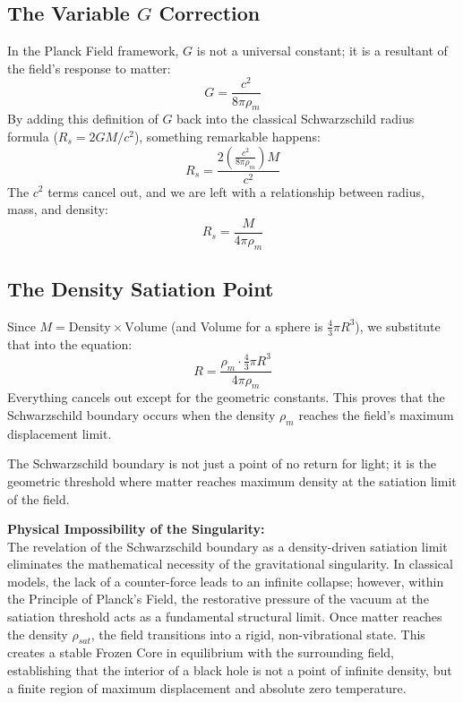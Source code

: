\documentclass[12pt,a4paper]{article}
\begin{document}
\subsection{The Variable $G$ Correction}
In the Planck Field framework, $G$ is not a universal constant; it is a resultant of the field's response to matter:
\begin{equation}
G = \frac{c^2}{8\pi\rho_m}
\end{equation}
By adding this definition of $G$ back into the classical Schwarzschild radius formula ($R_s = 2GM/c^2$), something remarkable happens:
\begin{equation}
R_s = \frac{2 \left(\frac{c^2}{8\pi\rho_m}\right) M}{c^2}
\end{equation}
The $c^2$ terms cancel out, and we are left with a relationship between radius, mass, and density:
\begin{equation}
R_s = \frac{M}{4\pi\rho_m}
\end{equation}

\subsection{The Density Satiation Point}
Since $M = \text{Density} \times \text{Volume}$ (and Volume for a sphere is $\frac{4}{3}\pi R^3$), we substitute that into the equation:
\begin{equation}
R = \frac{\rho_m \cdot \frac{4}{3}\pi R^3}{4\pi\rho_m}
\end{equation}
Everything cancels out except for the geometric constants. This proves that the Schwarzschild boundary occurs when the density $\rho_m$ reaches the field's maximum displacement limit.

The Schwarzschild boundary is not just a point of no return for light; it is the geometric threshold where matter reaches maximum density at the satiation limit of the field.

\textbf{Physical Impossibility of the Singularity:}\\
The revelation of the Schwarzschild boundary as a density-driven satiation limit eliminates the mathematical necessity of the gravitational singularity. In classical models, the lack of a counter-force leads to an infinite collapse; however, within the Principle of Planck's Field, the restorative pressure of the vacuum at the satiation threshold acts as a fundamental structural limit. Once matter reaches the density $\rho_{sat}$, the field transitions into a rigid, non-vibrational state. This creates a stable Frozen Core in equilibrium with the surrounding field, establishing that the interior of a black hole is not a point of infinite density, but a finite region of maximum displacement and absolute zero temperature.
\end{document}
